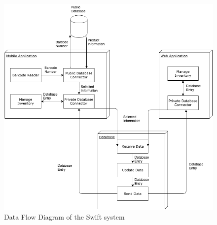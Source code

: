 
\begin{figure}[h!]
	\centering
 	\includegraphics[width=\textwidth]{images/data_flow}
 \caption{Data Flow Diagram of the Swift system}
\end{figure}
